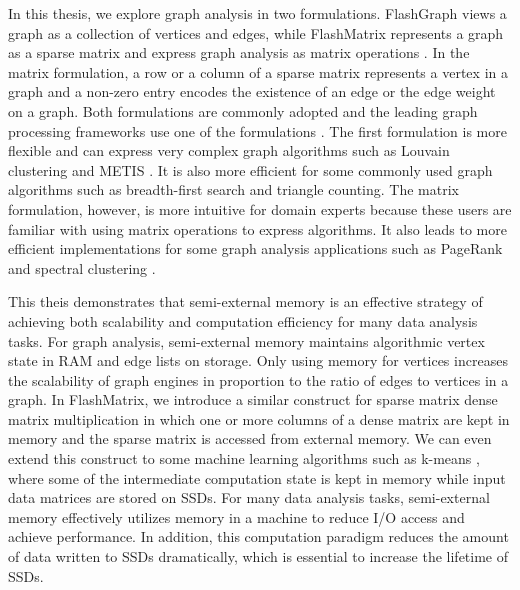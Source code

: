In this thesis, we explore graph analysis in two formulations. FlashGraph views
a graph as a collection of vertices and edges, while FlashMatrix represents
a graph as a sparse matrix and express graph analysis as matrix operations
\cite{Mattson13}. In the matrix formulation, a row or a column of a sparse
matrix represents a vertex in a graph and a non-zero entry encodes the existence
of an edge or the edge weight on a graph. Both formulations are commonly adopted
and the leading graph processing frameworks use one of the formulations
\cite{pregel, powergraph, graphx, graphchi, xstream, pegasus, heigen}.
The first formulation is more flexible and can express very complex graph
algorithms such as Louvain clustering \cite{louvain} and METIS \cite{metis}.
It is also more efficient for some commonly used graph algorithms such as
breadth-first search and triangle counting. The matrix formulation, however,
is more intuitive for domain experts because these users are familiar with
using matrix operations to express algorithms. It also leads to more efficient
implementations for some graph analysis applications such as PageRank
\cite{pagerank} and spectral clustering \cite{spectral}.

This theis demonstrates that semi-external memory is an effective strategy of
achieving both scalability and computation efficiency for many data analysis tasks.
For graph analysis, semi-external memory \cite{Abello98} maintains algorithmic
vertex state in RAM and edge lists on storage. Only using memory for vertices
increases the scalability of graph engines in proportion to the ratio of edges
to vertices in a graph. In FlashMatrix, we introduce a similar construct for
sparse matrix dense matrix multiplication in which one or more columns of
a dense matrix are kept in memory and the sparse matrix is accessed from
external memory. We can even extend this construct to some machine learning
algorithms such as k-means \cite{kmeans}, where some of the intermediate
computation state is kept in memory while input data matrices are stored on
SSDs. For many data analysis tasks, semi-external memory effectively utilizes
memory in a machine to reduce I/O access and achieve performance. In addition,
this computation paradigm reduces the amount of data written to SSDs
dramatically, which is essential to increase the lifetime of SSDs.

